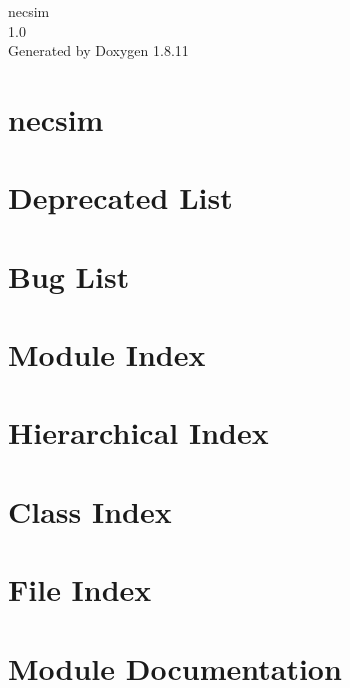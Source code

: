 \documentclass[twoside]{book}
\newcommand{\+}{\discretionary{\mbox{\scriptsize$\hookleftarrow$}}{}{}}
\newcommand{\clearemptydoublepage}{%
  \newpage{\pagestyle{empty}\cleardoublepage}%
}
\begin{document}
\hypersetup{pageanchor=false,
             bookmarksnumbered=true,
             pdfencoding=unicode
            }
\begin{titlepage}
\vspace*{7cm}
\begin{center}%
{\Large necsim \\[1ex]\large 1.\+0 }\\
\vspace*{1cm}
{\large Generated by Doxygen 1.8.11}\\
\end{center}
\end{titlepage}
\clearemptydoublepage
\tableofcontents
\clearemptydoublepage
{}
\hypersetup{pageanchor=true}

\chapter{necsim}
\label{md_necsim_README}
\hypertarget{md_necsim_README}{}

\chapter{Deprecated List}
\label{deprecated}
\hypertarget{deprecated}{}

\chapter{Bug List}
\label{bug}
\hypertarget{bug}{}

\chapter{Module Index}

\chapter{Hierarchical Index}

\chapter{Class Index}

\chapter{File Index}

\chapter{Module Documentation}

\end{document}
